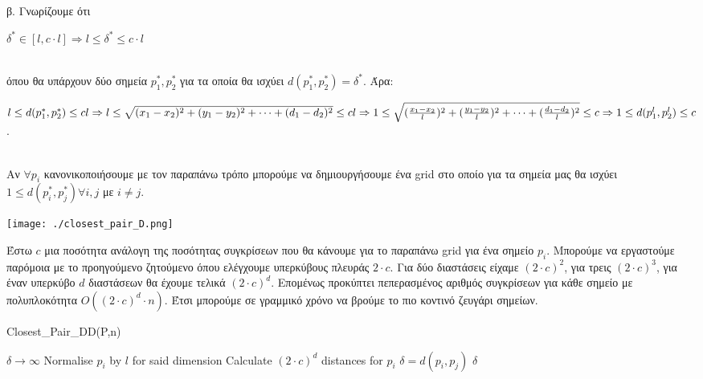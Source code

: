 \documentclass{article} \usepackage[greek,english]{babel}
\begin{document}
β. Γνωρίζουμε ότι\\
\begin{center}
    $\delta^* \in[l, c\cdot l] \Rightarrow l \le \delta^* \le c \cdot l$
\end{center}\\ 
όπου θα υπάρχουν δύο σημεία $p_{1}^*,p_{2}^*$ για τα οποία θα ισχύει $d(p_{1}^*,p_{2}^*) = \delta^*$. Άρα: \\
\begin{center}$l \le d(p_{1}^*,p_{2}^*) \le cl \Rightarrow \\
    l \le \sqrt{(x_1-x_2)^2+(y_1-y_2)^2+ \dots + (d_1-d_2)^2} \le cl \Rightarrow \\
    1 \le \sqrt{(\frac{x_1-x_2}{l})^2 + (\frac{y_1-y_2}{l})^2 + \dots + (\frac{d_1-d_2}{l})^2} \le c \Rightarrow \\ \\ 
    1 \le d(p_{1}^l,p_{2}^l) \le c$.
\end{center} \\
Αν $\forall p_i$ κανονικοποιήσουμε με τον παραπάνω τρόπο μπορούμε να δημιουργήσουμε ένα grid στο οποίο για τα σημεία μας
θα ισχύει $1 \le d(p_{i}^*,p_{j}^*) \forall i,j$ με $i \neq j$. \\

\begin{center}
    \texttt{[image: ./closest\_pair\_D.png]}
\end{center}
Έστω $c$ μια ποσότητα ανάλογη της ποσότητας συγκρίσεων που θα κάνουμε για το παραπάνω grid για ένα σημείο $p_i$.
Μπορούμε να εργαστούμε παρόμοια με το προηγούμενο ζητούμενο όπου ελέγχουμε υπερκύβους πλευράς $2\cdot c$.
Για δύο διαστάσεις είχαμε $(2\cdot c)^2$, για τρεις $(2\cdot c)^3$, για έναν υπερκύβο $d$ διαστάσεων 
θα έχουμε τελικά $(2\cdot c)^d$. Επομένως προκύπτει πεπερασμένος αριθμός συγκρίσεων για κάθε σημείο 
με πολυπλοκότητα $O((2\cdot c)^d \cdot n)$. Έτσι μπορούμε σε γραμμικό χρόνο να βρούμε το πιο κοντινό
ζευγάρι σημείων.

    \begin{algorithm}
        \caption{Closest\_Pair\_DD(P,n)}
        \begin{algorithmic}[1]
            \State $\delta \to \infty$
             
                    \State Normalise $p_i$ by $l$ for said dimension
                \EndFor
            \EndFor
            \State Calculate $(2\cdot c)^d$ distances for $p_i$ 
                    \State $\delta = d(p_i,p_j)$
                \EndIf
            \EndFor
        \Return $\delta$

        \end{algorithmic}
    \end{algorithm} \\
\end{document}
